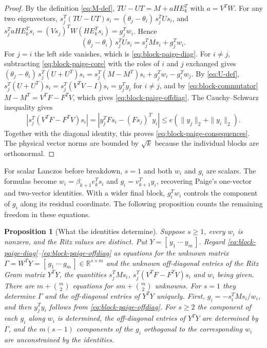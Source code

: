 \documentclass[11pt]{article}
\newtheorem{proposition}{Proposition}
\theoremstyle{definition}
\newcommand{\R}{\mathbb{R}}
\begin{document}
\begin{proof}
By the definition \eqref{eq:M-def}, $TU-UT=M+aHE_k^T$ with $a=V^TW$.  For
any two eigenvectors, $s_j^T(TU-UT)s_i=(\theta_j-\theta_i)\,s_j^TUs_i$, and
$s_j^TaHE_k^Ts_i=(Vs_j)^TW(HE_k^Ts_i)=g_j^Tw_i$.  Hence
\begin{equation}
 (\theta_j-\theta_i)\,s_j^TUs_i=s_j^TMs_i+g_j^Tw_i .
 \label{eq:block-paige-core}
\end{equation}
For $j=i$ the left side vanishes, which is \eqref{eq:block-paige-diag}.
For $i\ne j$, subtracting \eqref{eq:block-paige-core} with the roles of $i$ and
$j$ exchanged gives
$(\theta_j-\theta_i)\,s_j^T(U+U^T)s_i=s_j^T(M-M^T)s_i+g_j^Tw_i-g_i^Tw_j$.
By \eqref{eq:U-def}, $s_j^T(U+U^T)s_i=s_j^T(V^TV-I)s_i=y_j^Ty_i$ for
$i\ne j$, and by \eqref{eq:block-commutator} $M-M^T=V^TF-F^TV$, which gives
\eqref{eq:block-paige-offdiag}.  The Cauchy--Schwarz inequality gives
\[
|s_j^T(V^TF-F^TV)s_i|
=|y_j^TFs_i-(Fs_j)^Ty_i|
\le e(\|y_j\|_2+\|y_i\|_2).
\]
Together with the diagonal identity, this proves
\eqref{eq:block-paige-consequences}.  The physical vector norms are bounded
by $\sqrt{k}$ because the individual blocks are orthonormal.
\end{proof}

For scalar Lanczos before breakdown, $s=1$ and both $w_i$ and $g_i$ are
scalars.  The formulas become
$w_i=\beta_{k+1}e_k^Ts_i$ and $g_i=v_{k+1}^Ty_i$, recovering Paige's
one-vector and two-vector identities.  With a wider final block,
$g_i^Tw_i$ controls the component of $g_i$ along its residual coordinate.
The following proposition counts the remaining freedom in these equations.

\begin{proposition}[What the identities determine]
\label{prop:dof}
Suppose $s\ge1$, every $w_i$ is nonzero, and the Ritz values are distinct.
Put $Y=[\,y_1\ \cdots\ y_m\,]$.  Regard
\eqref{eq:block-paige-diag}--\eqref{eq:block-paige-offdiag} as
equations for the unknown matrix $\Gamma=W^TY=[\,g_1\ \cdots\ g_m\,]\in\R^{s\times m}$
and the unknown off-diagonal entries of the Ritz Gram matrix $Y^TY$, the
quantities $s_j^TMs_i$, $s_j^T(V^TF-F^TV)s_i$ and $w_i$ being given.
There are $m+\binom m2$ equations for
$sm+\binom m2$ unknowns.  For $s=1$ they determine $\Gamma$ and the
off-diagonal entries of $Y^TY$
uniquely.  First, $g_i=-s_i^TMs_i/w_i$, and then $y_j^Ty_i$ follows from
\eqref{eq:block-paige-offdiag}.  For $s\ge2$ the component of each $g_i$
along $w_i$ is determined, the off-diagonal entries of $Y^TY$ are determined
by $\Gamma$, and the
$m(s-1)$ components of the $g_i$ orthogonal to the corresponding $w_i$ are
unconstrained by the identities.
\end{proposition}
\end{document}
